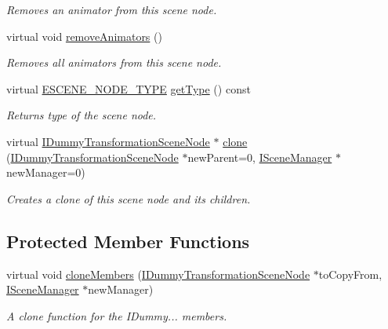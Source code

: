 \begin{DoxyCompactItemize}
\begin{DoxyCompactList}\small\item\em Removes an animator from this scene node. \end{DoxyCompactList}\item 
virtual void \hyperlink{classirr_1_1scene_1_1IDummyTransformationSceneNode_af6bb280ece8f5cf84f50603d337c18c1}{remove\+Animators} ()
\begin{DoxyCompactList}\small\item\em Removes all animators from this scene node. \end{DoxyCompactList}\item 
virtual \hyperlink{namespaceirr_1_1scene_acad3d7ef92a9807d391ba29120f3b7bd}{E\+S\+C\+E\+N\+E\+\_\+\+N\+O\+D\+E\+\_\+\+T\+Y\+PE} \hyperlink{classirr_1_1scene_1_1IDummyTransformationSceneNode_a4ac844750b866a1c05e72c3288b3d6cd}{get\+Type} () const \hypertarget{classirr_1_1scene_1_1IDummyTransformationSceneNode_a4ac844750b866a1c05e72c3288b3d6cd}{}\label{classirr_1_1scene_1_1IDummyTransformationSceneNode_a4ac844750b866a1c05e72c3288b3d6cd}

\begin{DoxyCompactList}\small\item\em Returns type of the scene node. \end{DoxyCompactList}\item 
virtual \hyperlink{classirr_1_1scene_1_1IDummyTransformationSceneNode}{I\+Dummy\+Transformation\+Scene\+Node} $\ast$ \hyperlink{classirr_1_1scene_1_1IDummyTransformationSceneNode_a3fb98da7defed119bd565f5e7fefb5f3}{clone} (\hyperlink{classirr_1_1scene_1_1IDummyTransformationSceneNode}{I\+Dummy\+Transformation\+Scene\+Node} $\ast$new\+Parent=0, \hyperlink{classirr_1_1scene_1_1ISceneManager}{I\+Scene\+Manager} $\ast$new\+Manager=0)\hypertarget{classirr_1_1scene_1_1IDummyTransformationSceneNode_a3fb98da7defed119bd565f5e7fefb5f3}{}\label{classirr_1_1scene_1_1IDummyTransformationSceneNode_a3fb98da7defed119bd565f5e7fefb5f3}

\begin{DoxyCompactList}\small\item\em Creates a clone of this scene node and its children. \end{DoxyCompactList}\end{DoxyCompactItemize}
\subsection*{Protected Member Functions}
\begin{DoxyCompactItemize}
\item 
virtual void \hyperlink{classirr_1_1scene_1_1IDummyTransformationSceneNode_a5dbc7f63a04a445fc1fbe8efbb1287b3}{clone\+Members} (\hyperlink{classirr_1_1scene_1_1IDummyTransformationSceneNode}{I\+Dummy\+Transformation\+Scene\+Node} $\ast$to\+Copy\+From, \hyperlink{classirr_1_1scene_1_1ISceneManager}{I\+Scene\+Manager} $\ast$new\+Manager)
\begin{DoxyCompactList}\small\item\em A clone function for the I\+Dummy... members. \end{DoxyCompactList}\end{DoxyCompactItemize}
